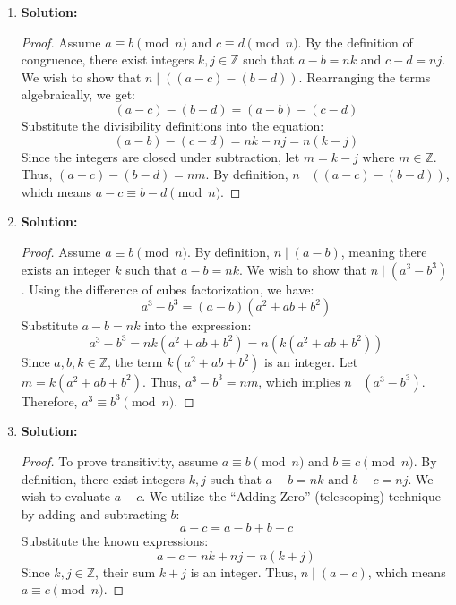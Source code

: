 \documentclass{article}
\begin{document}
\begin{enumerate}
    \item \textbf{Solution:} 
    \begin{proof}
        Assume $a \equiv b \pmod n$ and $c \equiv d \pmod n$. By the definition of congruence, there exist integers $k, j \in \mathbb{Z}$ such that $a - b = nk$ and $c - d = nj$. We wish to show that $n \mid ((a - c) - (b - d))$. Rearranging the terms algebraically, we get:
        \[ (a - c) - (b - d) = (a - b) - (c - d) \]
        Substitute the divisibility definitions into the equation:
        \[ (a - b) - (c - d) = nk - nj = n(k - j) \]
        Since the integers are closed under subtraction, let $m = k - j$ where $m \in \mathbb{Z}$. Thus, $(a - c) - (b - d) = nm$. By definition, $n \mid ((a - c) - (b - d))$, which means $a - c \equiv b - d \pmod n$.
    \end{proof}

    \item \textbf{Solution:}
    \begin{proof}
        Assume $a \equiv b \pmod n$. By definition, $n \mid (a - b)$, meaning there exists an integer $k$ such that $a - b = nk$. We wish to show that $n \mid (a^3 - b^3)$. Using the difference of cubes factorization, we have:
        \[ a^3 - b^3 = (a - b)(a^2 + ab + b^2) \]
        Substitute $a - b = nk$ into the expression:
        \[ a^3 - b^3 = nk(a^2 + ab + b^2) = n \left( k(a^2 + ab + b^2) \right) \]
        Since $a, b, k \in \mathbb{Z}$, the term $k(a^2 + ab + b^2)$ is an integer. Let $m = k(a^2 + ab + b^2)$. Thus, $a^3 - b^3 = nm$, which implies $n \mid (a^3 - b^3)$. Therefore, $a^3 \equiv b^3 \pmod n$.
    \end{proof}

    \item \textbf{Solution:}
    \begin{proof}
        To prove transitivity, assume $a \equiv b \pmod n$ and $b \equiv c \pmod n$. By definition, there exist integers $k, j$ such that $a - b = nk$ and $b - c = nj$. We wish to evaluate $a - c$. We utilize the ``Adding Zero'' (telescoping) technique by adding and subtracting $b$:
        \[ a - c = a - b + b - c \]
        Substitute the known expressions:
        \[ a - c = nk + nj = n(k + j) \]
        Since $k, j \in \mathbb{Z}$, their sum $k + j$ is an integer. Thus, $n \mid (a - c)$, which means $a \equiv c \pmod n$.
    \end{proof}


\end{enumerate}
\end{document}
